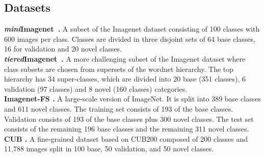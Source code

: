 \documentclass[runningheads]{llncs}
\begin{document}
\subsection{Datasets}
\noindent\textbf{\textit{mini}Imagenet~\cite{ravi2016optimization}.} A subset of the Imagenet dataset \cite{ILSVRC15} consisting of 100 classes with 600 images per class. Classes are divided in three disjoint sets of 64 base classes, 16 for validation and 20 novel classes. \smallskip\\ \noindent\textbf{\textit{tiered}Imagenet~\cite{ren2018metalearning}.} A more challenging subset of the Imagenet dataset \cite{ILSVRC15} where class subsets are chosen from supersets of the wordnet hierarchy. The top hierarchy has 34 super-classes, which are divided into 20 base (351 classes), 6 validation (97 classes) and 8 novel (160 classes) categories.\smallskip\\
\noindent\textbf{Imagenet-FS \cite{hariharan2017low}.} A large-scale version of ImageNet. It is split into 389 base classes and 611 novel classes. The training set consists of 193 of the base classes. Validation consists of 193 of the base classes plus 300 novel classes. The test set consists of the remaining 196 base classes and the remaining 311 novel classes.\smallskip \\
\noindent\textbf{CUB \cite{chen2018a,hilliard2018few}.} A fine-grained dataset based on CUB200 \cite{WelinderEtal2010} composed of 200 classes and 11,788 images split in 100 base, 50 validation, and 50 novel classes.
\end{document}
